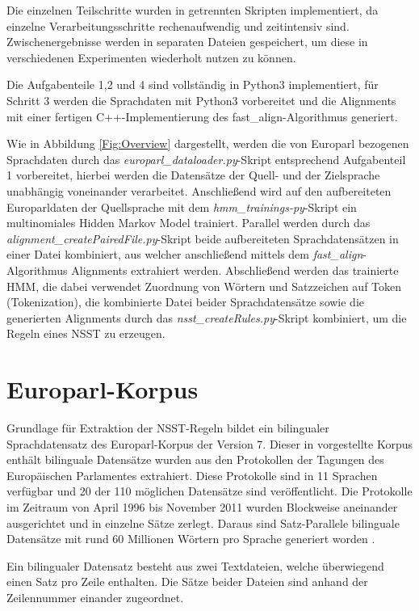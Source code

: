 \documentclass[conference]{IEEEtran}
\begin{document}
Die einzelnen Teilschritte wurden in getrennten Skripten implementiert, da einzelne Verarbeitungsschritte rechenaufwendig und zeitintensiv sind.
Zwischenergebnisse werden in separaten Dateien gespeichert, um diese in verschiedenen Experimenten wiederholt nutzen zu können.

Die Aufgabenteile 1,2 und 4 sind vollständig in Python3 implementiert, für Schritt 3 werden die Sprachdaten mit Python3\- vorbereitet und die Alignments mit einer fertigen C++-Implementierung des fast\_align-Algorithmus \cite{fast_align} generiert.

Wie in Abbildung \ref{Fig:Overview} dargestellt, werden die von Europarl bezogenen Sprachdaten durch das \textit{europarl\_dataloader.py}-Skript entsprechend Aufgabenteil 1 vorbereitet, hierbei werden die Datensätze der Quell- und der Zielsprache unabhängig voneinander verarbeitet.
Anschließend wird auf den aufbereiteten Europarldaten der Quellsprache mit dem \textit{hmm\_trainings-py}-Skript ein multinomiales Hidden Markov Model trainiert.
Parallel werden durch das \textit{alignment\_createPairedFile.py}-Skript beide aufbereiteten Sprachdatensätzen in einer Datei kombiniert, aus welcher anschließend mittels dem \textit{fast\_align}-Algorithmus Alignments extrahiert werden.
Abschließend werden das trainierte HMM, die dabei verwendet Zuordnung von Wörtern und Satzzeichen auf Token (Tokenization), die kombinierte Datei beider Sprachdatensätze sowie die generierten Alignments durch das \textit{nsst\_createRules.py}-Skript kombiniert, um die Regeln eines NSST zu erzeugen.

\section{Europarl-Korpus}
\label{Europarl-Korpus}
Grundlage für Extraktion der NSST-Regeln bildet ein bilingualer Sprachdatensatz des Europarl-Korpus der Version 7.
Dieser in \cite{europarl} vorgestellte Korpus enthält bilinguale Daten\-sätze wurden aus den Protokollen der Tagungen des Europäischen Parlamentes extrahiert.
Diese Protokolle sind in 11 Sprachen verfügbar und 20 der 110 möglichen Datensätze sind veröffentlicht.
Die Protokolle im Zeitraum von April 1996 bis November 2011 wurden Blockweise aneinander ausgerichtet und in einzelne Sätze zerlegt. 
Daraus sind Satz-Parallele bilinguale Datensätze mit rund 60 Millionen Wörtern pro Sprache generiert worden \cite{europarl:url}.

Ein bilingualer Datensatz besteht aus zwei Textdateien, welche überwiegend einen Satz pro Zeile enthalten. 
Die Sätze beider Dateien sind anhand der Zeilennummer einander zugeordnet.
\end{document}
